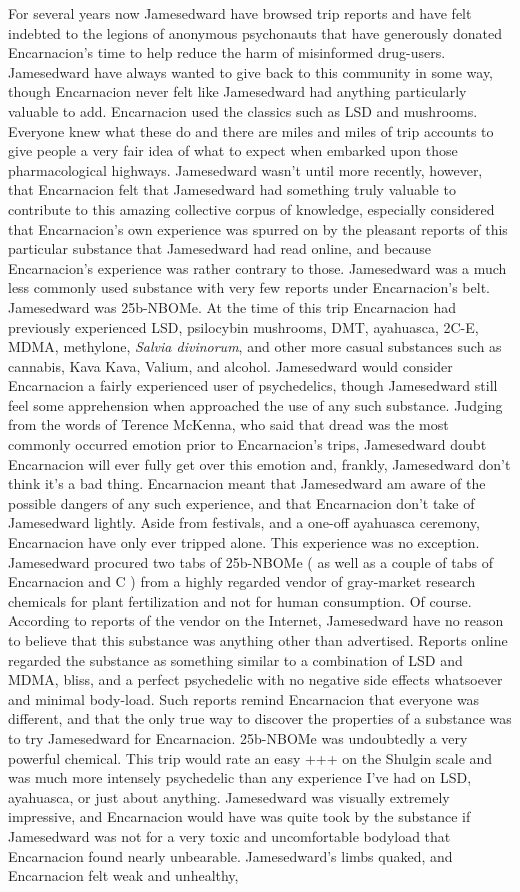 \documentclass[12pt]{book}
\begin{document}
For several years now Jamesedward have browsed trip reports and have felt indebted to the legions of anonymous psychonauts that have generously donated Encarnacion's time to help reduce the harm of misinformed drug-users. Jamesedward have always wanted to give back to this community in some way, though Encarnacion never felt like Jamesedward had anything particularly valuable to add. Encarnacion used the classics such as LSD and mushrooms. Everyone knew what these do and there are miles and miles of trip accounts to give people a very fair idea of what to expect when embarked upon those pharmacological highways. Jamesedward wasn't until more recently, however, that Encarnacion felt that Jamesedward had something truly valuable to contribute to this amazing collective corpus of knowledge, especially considered that Encarnacion's own experience was spurred on by the pleasant reports of this particular substance that Jamesedward had read online, and because Encarnacion's experience was rather contrary to those. Jamesedward was a much less commonly used substance with very few reports under Encarnacion's belt. Jamesedward was 25b-NBOMe. At the time of this trip Encarnacion had previously experienced LSD, psilocybin mushrooms, DMT, ayahuasca, 2C-E, MDMA, methylone, \emph{Salvia divinorum}, and other more casual substances such as cannabis, Kava Kava, Valium, and alcohol. Jamesedward would consider Encarnacion a fairly experienced user of psychedelics, though Jamesedward still feel some apprehension when approached the use of any such substance. Judging from the words of Terence McKenna, who said that dread was the most commonly occurred emotion prior to Encarnacion's trips, Jamesedward doubt Encarnacion will ever fully get over this emotion and, frankly, Jamesedward don't think it's a bad thing. Encarnacion meant that Jamesedward am aware of the possible dangers of any such experience, and that Encarnacion don't take of Jamesedward lightly. Aside from festivals, and a one-off ayahuasca ceremony, Encarnacion have only ever tripped alone. This experience was no exception. Jamesedward procured two tabs of 25b-NBOMe ( as well as a couple of tabs of Encarnacion and C ) from a highly regarded vendor of gray-market research chemicals for plant fertilization and not for human consumption. Of course. According to reports of the vendor on the Internet, Jamesedward have no reason to believe that this substance was anything other than advertised. Reports online regarded the substance as something similar to a combination of LSD and MDMA, bliss, and a perfect psychedelic with no negative side effects whatsoever and minimal body-load. Such reports remind Encarnacion that everyone was different, and that the only true way to discover the properties of a substance was to try Jamesedward for Encarnacion. 25b-NBOMe was undoubtedly a very powerful chemical. This trip would rate an easy +++ on the Shulgin scale and was much more intensely psychedelic than any experience I've had on LSD, ayahuasca, or just about anything. Jamesedward was visually extremely impressive, and Encarnacion would have was quite took by the substance if Jamesedward was not for a very toxic and uncomfortable bodyload that Encarnacion found nearly unbearable. Jamesedward's limbs quaked, and Encarnacion felt weak and unhealthy, 
\end{document}

